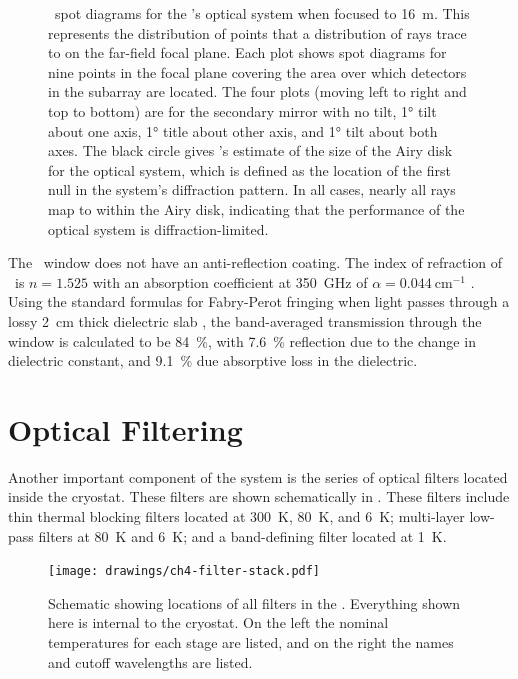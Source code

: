 \begin{figure}
\begin{tabular}{lr}
\end{tabular}
\caption[\ZEMAX\ spot diagrams]{
\ZEMAX\ spot diagrams for the \Imager's optical system when focused to \SI{16}{\m}.
This represents the distribution of points that a distribution of rays trace to on the far-field focal plane.
Each plot shows spot diagrams for nine points in the focal plane covering the area over which detectors in the subarray are located.
The four plots (moving left to right and top to bottom) are for the secondary mirror with no tilt, \ang{1} tilt about one axis, \ang{1} title about other axis, and \ang{1} tilt about both axes.
The black circle gives \ZEMAX's estimate of the size of the Airy disk for the optical system, which is defined as the location of the first null in the system's diffraction pattern.
In all cases, nearly all rays map to within the Airy disk, indicating that the performance of the optical system is diffraction-limited.
}
\label{fig:ch4-spot-diagrams}
\end{figure}

The \HDPE\ window does not have an anti-reflection coating.
The index of refraction of \HDPE\ is $n=1.525$ with an absorption coefficient at \SI{350}{\GHz} of $\alpha = \SI{0.044}{\cm^{-1}}$ \cite{lamb_miscellaneous_1996}.
Using the standard formulas for Fabry-Perot fringing when light passes through a lossy \SI{2}{\cm} thick dielectric slab \cite[Chapter~5]{sophocles_j._ordanidis_electromagnetic_2014}, the band-averaged transmission through the window is calculated to be \SI{84}{\percent}, with \SI{7.6}{\percent} reflection due to the change in dielectric constant, and \SI{9.1}{\percent} due absorptive loss in the dielectric.

\section{Optical Filtering} \label{sec:ch4-filters}

Another important component of the system is the series of optical filters located inside the cryostat.
These filters are shown schematically in .
These filters include thin thermal blocking filters located at \SI{300}{\K}, \SI{80}{\K}, and \SI{6}{\K}; multi-layer low-pass filters at \SI{80}{\K} and \SI{6}{\K}; and a band-defining filter located at \SI{1}{\K}.

\begin{figure}
\centering
\texttt{[image: drawings/ch4-filter-stack.pdf]}
\caption[Schematic showing locations of all filters in the \Imager]{
  Schematic showing locations of all filters in the \Imager.
  Everything shown here is internal to the cryostat.
  On the left the nominal temperatures for each stage are listed, and on the right the names and cutoff wavelengths are listed.
}
\label{fig:ch4-filter-stack}
\end{figure}

